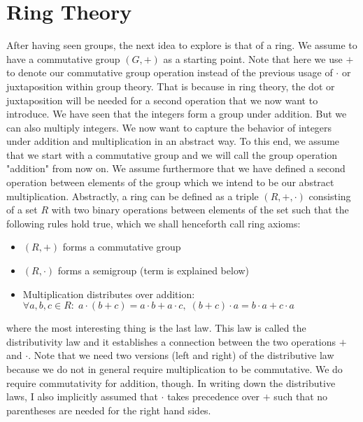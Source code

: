 \section{Ring Theory}
After having seen groups, the next idea to explore is that of a ring. We assume to have a commutative group $(G, +)$ as a starting point. Note that here we use $+$ to denote our commutative group operation instead of the previous usage of $\cdot$ or juxtaposition within group theory. That is because in ring theory, the dot or juxtaposition will be needed for a second operation that we now want to introduce. We have seen that the integers form a group under addition. But we can also multiply integers. We now want to capture the behavior of integers under addition and multiplication in an abstract way. To this end, we assume that we start with a commutative group and we will call the group operation "addition" from now on. We assume furthermore that we have defined a second operation between elements of the group which we intend to be our abstract multiplication. Abstractly, a ring can be defined as a triple $(R,+,\cdot)$ consisting of a set $R$ with two binary operations between elements of the set such that the following rules hold true, which we shall henceforth call ring axioms:
\begin{itemize}
\item $(R,+)$ forms a commutative group
\item $(R,\cdot)$ forms a semigroup (term is explained below)
\item Multiplication distributes over addition: 
$\forall a,b,c \in R: \;  
a \cdot (b + c) = a \cdot b + a \cdot c, \; 
(b + c) \cdot a = b \cdot a + c \cdot a$
\end{itemize}
where the most interesting thing is the last law. This law is called the distributivity law and it establishes a connection between the two operations $+$ and $\cdot$. Note that we need two versions (left and right) of the distributive law because we do not in general require multiplication to be commutative. We do require commutativity for addition, though. In writing down the distributive laws, I also implicitly assumed that $\cdot$ takes precedence over $+$ such that no parentheses are needed for the right hand sides.


